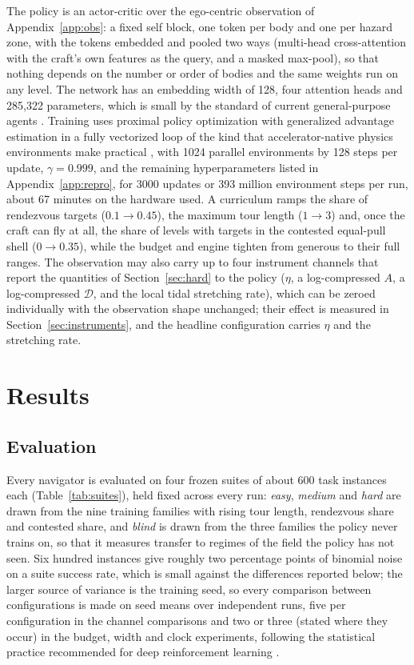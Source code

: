 \documentclass[11pt]{article}
\newcommand{\dd}{\mathcal{D}}
\begin{document}
The policy is an actor-critic over the ego-centric observation of
Appendix~\ref{app:obs}: a fixed self block, one token per body and one per
hazard zone, with the tokens embedded and pooled two ways (multi-head
cross-attention with the craft's own features as the query, and a masked
max-pool), so that nothing depends on the number or order of bodies and the
same weights run on any level. The network has an embedding width of 128,
four attention heads and 285,322 parameters, which is small by the standard
of current general-purpose agents \cite{lee2025}. Training uses proximal
policy optimization \cite{schulman2017} with generalized advantage
estimation \cite{schulman2016} in a fully vectorized loop of the kind that
accelerator-native physics environments make practical \cite{matthews2025},
with 1024 parallel environments by 128 steps per update, $\gamma = 0.999$,
and the remaining hyperparameters listed in Appendix~\ref{app:repro}, for
3000 updates or 393 million environment steps per run, about 67 minutes on
the hardware used. A curriculum
\cite{bengio2009,narvekar2020} ramps the share of rendezvous targets
($0.1 \to 0.45$), the maximum tour length ($1 \to 3$) and, once the craft
can fly at all, the share of levels with targets in the contested
equal-pull shell ($0 \to 0.35$), while the budget and engine tighten from
generous to their full ranges. The observation may also
carry up to four instrument channels that report the quantities of
Section~\ref{sec:hard} to the policy ($\eta$, a log-compressed $A$, a
log-compressed $\dd$, and the local tidal stretching rate), which can be
zeroed individually with the observation shape unchanged; their effect is
measured in Section~\ref{sec:instruments}, and the headline configuration
carries $\eta$ and the stretching rate.
\section{Results}
\label{sec:results}

\subsection{Evaluation}
\label{sec:evaluation}

Every navigator is evaluated on four frozen suites of about 600 task
instances each (Table~\ref{tab:suites}), held fixed across every run:
\emph{easy}, \emph{medium} and \emph{hard} are drawn from the nine training
families with rising tour length, rendezvous share and contested share, and
\emph{blind} is drawn from the three families the policy never trains on,
so that it measures transfer to regimes of the field the policy has not
seen. Six hundred instances give roughly two percentage points of binomial
noise on a suite success rate, which is small against the differences
reported below; the larger source of variance is the training seed, so every comparison
between configurations is made on seed means over independent runs, five
per configuration in the channel comparisons and two or three (stated where
they occur) in the budget, width and clock experiments, following the
statistical practice recommended for deep reinforcement learning
\cite{agarwal2021,henderson2018,colas2018}.
\end{document}
